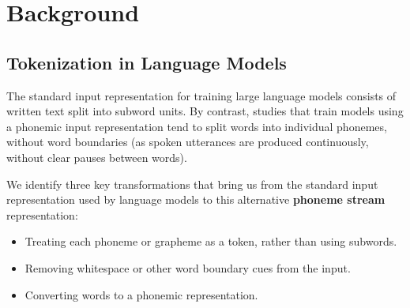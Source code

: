 \chapter{Background}


\section{Tokenization in Language Models}\label{sec:12-tokenization}



The standard input representation for training large language models consists of written text split into subword units. By contrast, studies that train models using a phonemic input representation tend to split words into individual phonemes, without word boundaries (as spoken utterances are produced continuously, without clear pauses between words).

We identify three key transformations that bring us from the standard input representation used by language models to this alternative \textbf{phoneme stream} representation:


\begin{itemize}
\setlength\itemsep{0.1em}
    \item {} Treating each phoneme or grapheme as a token, rather than using subwords.
    \item {} Removing whitespace or other word boundary cues from the input.
    \item {} Converting words to a phonemic representation. 
\end{itemize}

